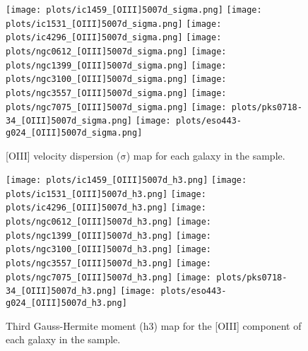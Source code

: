 \documentclass[fleqn,usenatbib,useAMS]{mnras}
\begin{document}
		\begin{figure*}
			\centering
			\texttt{[image: plots/ic1459\_[OIII]5007d\_sigma.png]}
			\texttt{[image: plots/ic1531\_[OIII]5007d\_sigma.png]}
			\texttt{[image: plots/ic4296\_[OIII]5007d\_sigma.png]}
			\texttt{[image: plots/ngc0612\_[OIII]5007d\_sigma.png]}
			\texttt{[image: plots/ngc1399\_[OIII]5007d\_sigma.png]}
			\texttt{[image: plots/ngc3100\_[OIII]5007d\_sigma.png]}
			\texttt{[image: plots/ngc3557\_[OIII]5007d\_sigma.png]}
			\texttt{[image: plots/ngc7075\_[OIII]5007d\_sigma.png]}
			\texttt{[image: plots/pks0718-34\_[OIII]5007d\_sigma.png]}
			\texttt{[image: plots/eso443-g024\_[OIII]5007d\_sigma.png]}
			\caption{[OIII] velocity dispersion ($\mathrm{\sigma}$) map for each galaxy in the sample.}
			\label{fig:OIII_sigma}
		\end{figure*}


		\begin{figure*}
			\centering
			\texttt{[image: plots/ic1459\_[OIII]5007d\_h3.png]}
			\texttt{[image: plots/ic1531\_[OIII]5007d\_h3.png]}
			\texttt{[image: plots/ic4296\_[OIII]5007d\_h3.png]}
			\texttt{[image: plots/ngc0612\_[OIII]5007d\_h3.png]}
			\texttt{[image: plots/ngc1399\_[OIII]5007d\_h3.png]}
			\texttt{[image: plots/ngc3100\_[OIII]5007d\_h3.png]}
			\texttt{[image: plots/ngc3557\_[OIII]5007d\_h3.png]}
			\texttt{[image: plots/ngc7075\_[OIII]5007d\_h3.png]}
			\texttt{[image: plots/pks0718-34\_[OIII]5007d\_h3.png]}
			\texttt{[image: plots/eso443-g024\_[OIII]5007d\_h3.png]}
			\caption{Third Gauss-Hermite moment (h3) map for the [OIII] component of each galaxy in the sample.}
			\label{fig:OIII_h3}
		\end{figure*}
\end{document}
